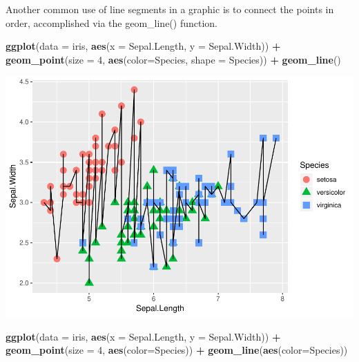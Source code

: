 \documentclass[]{article}
\newenvironment{Shaded}{\begin{snugshade}}{\end{snugshade}}
\newcommand{\KeywordTok}[1]{\textcolor[rgb]{0.13,0.29,0.53}{\textbf{#1}}}
\newcommand{\DataTypeTok}[1]{\textcolor[rgb]{0.13,0.29,0.53}{#1}}
\newcommand{\DecValTok}[1]{\textcolor[rgb]{0.00,0.00,0.81}{#1}}
\newcommand{\StringTok}[1]{\textcolor[rgb]{0.31,0.60,0.02}{#1}}
\newcommand{\OperatorTok}[1]{\textcolor[rgb]{0.81,0.36,0.00}{\textbf{#1}}}
\newcommand{\NormalTok}[1]{#1}
\begin{document}
Another common use of line segments in a graphic is to connect the
points in order, accomplished via the geom\_line() function.

\begin{Shaded}
\begin{Highlighting}[]
\KeywordTok{ggplot}\NormalTok{(}\DataTypeTok{data =}\NormalTok{ iris, }\KeywordTok{aes}\NormalTok{(}\DataTypeTok{x =}\NormalTok{ Sepal.Length, }\DataTypeTok{y =}\NormalTok{ Sepal.Width)) }\OperatorTok{+}
\StringTok{      }\KeywordTok{geom_point}\NormalTok{(}\DataTypeTok{size =} \DecValTok{4}\NormalTok{, }\KeywordTok{aes}\NormalTok{(}\DataTypeTok{color=}\NormalTok{Species, }\DataTypeTok{shape =}\NormalTok{ Species)) }\OperatorTok{+}
\StringTok{      }\KeywordTok{geom_line}\NormalTok{()}
\end{Highlighting}
\end{Shaded}

\includegraphics{stt-301-programming_files/figure-latex/unnamed-chunk-61-1.pdf}

\begin{Shaded}
\begin{Highlighting}[]
      \KeywordTok{ggplot}\NormalTok{(}\DataTypeTok{data =}\NormalTok{ iris, }\KeywordTok{aes}\NormalTok{(}\DataTypeTok{x =}\NormalTok{ Sepal.Length, }\DataTypeTok{y =}\NormalTok{ Sepal.Width)) }\OperatorTok{+}
\StringTok{      }\KeywordTok{geom_point}\NormalTok{(}\DataTypeTok{size =} \DecValTok{4}\NormalTok{, }\KeywordTok{aes}\NormalTok{(}\DataTypeTok{color=}\NormalTok{Species)) }\OperatorTok{+}
\StringTok{      }\KeywordTok{geom_line}\NormalTok{(}\KeywordTok{aes}\NormalTok{(}\DataTypeTok{color=}\NormalTok{Species))}
\end{Highlighting}
\end{Shaded}
\end{document}

